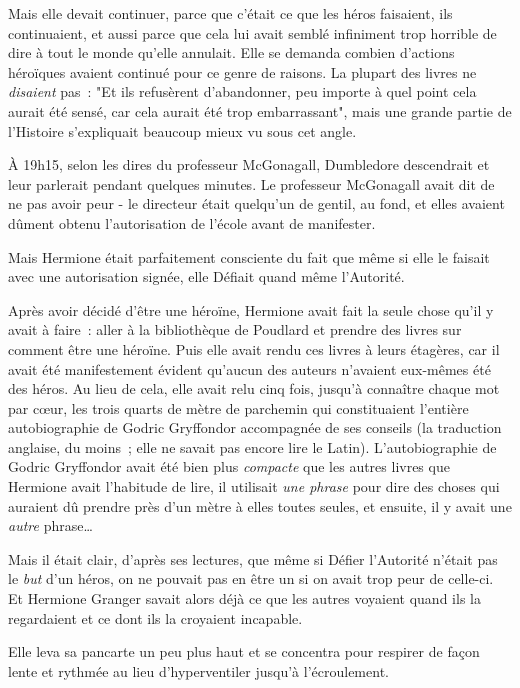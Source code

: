 Mais elle devait continuer, parce que c'était ce que les héros faisaient, ils continuaient, et aussi parce que cela lui avait semblé infiniment trop horrible de dire à tout le monde qu'elle annulait. Elle se demanda combien d'actions héroïques avaient continué pour ce genre de raisons. La plupart des livres ne \emph{disaient} pas~: "Et ils refusèrent d'abandonner, peu importe à quel point cela aurait été sensé, car cela aurait été trop embarrassant", mais une grande partie de l'Histoire s'expliquait beaucoup mieux vu sous cet angle.

À 19h15, selon les dires du professeur McGonagall, Dumbledore descendrait et leur parlerait pendant quelques minutes. Le professeur McGonagall avait dit de ne pas avoir peur - le directeur était quelqu'un de gentil, au fond, et elles avaient dûment obtenu l'autorisation de l'école avant de manifester.

Mais Hermione était parfaitement consciente du fait que même si elle le faisait avec une autorisation signée, elle Défiait quand même l'Autorité.

Après avoir décidé d'être une héroïne, Hermione avait fait la seule chose qu'il y avait à faire~: aller à la bibliothèque de Poudlard et prendre des livres sur comment être une héroïne. Puis elle avait rendu ces livres à leurs étagères, car il avait été manifestement évident qu'aucun des auteurs n'avaient eux-mêmes été des héros. Au lieu de cela, elle avait relu cinq fois, jusqu'à connaître chaque mot par cœur, les trois quarts de mètre de parchemin qui constituaient l'entière autobiographie de Godric Gryffondor accompagnée de ses conseils (la traduction anglaise, du moins~; elle ne savait pas encore lire le Latin). L'autobiographie de Godric Gryffondor avait été bien plus \emph{compacte} que les autres livres que Hermione avait l'habitude de lire, il utilisait \emph{une phrase} pour dire des choses qui auraient dû prendre près d'un mètre à elles toutes seules, et ensuite, il y avait une \emph{autre} phrase…

Mais il était clair, d'après ses lectures, que même si Défier l'Autorité n'était pas le \emph{but} d'un héros, on ne pouvait pas en être un si on avait trop peur de celle-ci. Et Hermione Granger savait alors déjà ce que les autres voyaient quand ils la regardaient et ce dont ils la croyaient incapable.

Elle leva sa pancarte un peu plus haut et se concentra pour respirer de façon lente et rythmée au lieu d'hyperventiler jusqu'à l'écroulement.

